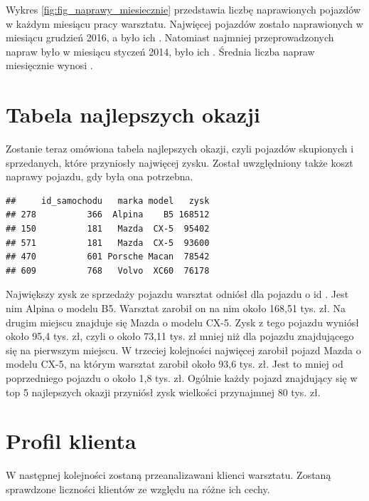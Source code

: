 \documentclass{article}\usepackage[]{graphicx}\usepackage[]{xcolor}
\makeatletter
\newenvironment{kframe}{%
 \def\at@end@of@kframe{}%
 \ifinner\ifhmode%
  \def\at@end@of@kframe{\end{minipage}}%
  \begin{minipage}{\columnwidth}%
 \fi\fi%
 \def\FrameCommand##1{\hskip\@totalleftmargin \hskip-\fboxsep
 \colorbox{shadecolor}{##1}\hskip-\fboxsep
     \hskip-\linewidth \hskip-\@totalleftmargin \hskip\columnwidth}%
 \MakeFramed {\advance\hsize-\width
   \@totalleftmargin\z@ \linewidth\hsize
   \@setminipage}}%
 {\par\unskip\endMakeFramed%
 \at@end@of@kframe}
\newenvironment{knitrout}{}{} %
\makeatother
\begin{document}
Wykres \ref{fig:fig_naprawy_miesiecznie} przedstawia liczbę naprawionych pojazdów w każdym miesiącu pracy warsztatu. Najwięcej pojazdów zostało naprawionych w miesiącu 
grudzień 2016,
a było ich . Natomiast najmniej przeprowadzonych napraw było w miesiącu
styczeń 2014,
było ich . Średnia liczba napraw miesięcznie wynosi 
. 

\section{Tabela najlepszych okazji}

Zostanie teraz omówiona tabela najlepszych okazji, czyli pojazdów skupionych i sprzedanych, które przyniosły najwięcej zysku. Został uwzględniony także koszt naprawy pojazdu, gdy była ona potrzebna.





\begin{knitrout}
\color{fgcolor}\begin{kframe}
\begin{verbatim}
##     id_samochodu   marka model   zysk
## 278          366  Alpina    B5 168512
## 150          181   Mazda  CX-5  95402
## 571          181   Mazda  CX-5  93600
## 470          601 Porsche Macan  78542
## 609          768   Volvo  XC60  76178
\end{verbatim}
\end{kframe}
\end{knitrout}

Największy zysk ze sprzedaży pojazdu warsztat odniósł dla pojazdu o id . Jest nim Alpina o modelu B5. Warsztat zarobił on na nim około 168,51 tys. zł. 
Na drugim miejscu znajduje się Mazda o modelu CX-5. Zysk z tego pojazdu wyniósł około 95,4 tys. zł, czyli o około 73,11 tys. zł mniej niż dla pojazdu znajdującego się na pierwszym miejscu.
W trzeciej kolejności najwięcej zarobił pojazd Mazda o modelu CX-5, na którym warsztat zarobił około 93,6 tys. zł. Jest to mniej od poprzedniego pojazdu o około 1,8 tys. zł. 
Ogólnie każdy pojazd znajdujący się w top 5 najlepszych okazji przyniósł zysk wielkości przynajmnej 80 tys. zł.

\section{Profil klienta}

W następnej kolejności zostaną przeanalizawani klienci warsztatu. Zostaną sprawdzone liczności klientów ze względu na różne ich cechy.
\end{document}
